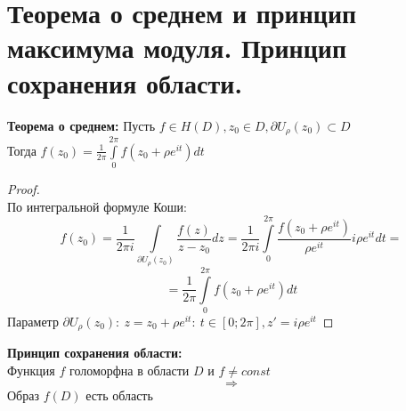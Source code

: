 \newpage
\section{Теорема о среднем и принцип максимума модуля. Принцип сохранения области.}

\textbf{Теорема о среднем:}
Пусть $f \in H(D), z_0 \in D, \partial U_{\rho}(z_0)\subset D$\\
Тогда $f(z_0) = \frac{1}{2\pi} \int\limits_{0}^{2\pi} f(z_0+\rho e^{it})dt$

\begin{proof}
    \ \\
    По интегральной формуле Коши:
    $$f(z_0)=\frac{1}{2\pi i}\int\limits_{\partial U_{\rho}(z_0)}\frac{f(z)}{z-z_0}dz = \frac{1}{2\pi i} \int\limits_{0}^{2\pi}\frac{f(z_0+\rho e^{it})}{\rho e^{it}}i\rho e^{it}dt=$$
    $$=\frac{1}{2\pi}\int\limits_0^{2\pi}f(z_0+\rho e^{it})dt$$
    Параметр $\partial U_{\rho}(z_0): \ z=z_0+\rho e^{it}: \ t\in[0; 2\pi], z'=i\rho e^{it}$
\end{proof}

\textbf{Принцип сохранения области:}\\[2mm]
Функция $f$ голоморфна в области $D$ и $f\neq const$
$$\Rightarrow$$
Образ $f(D)$ есть область

